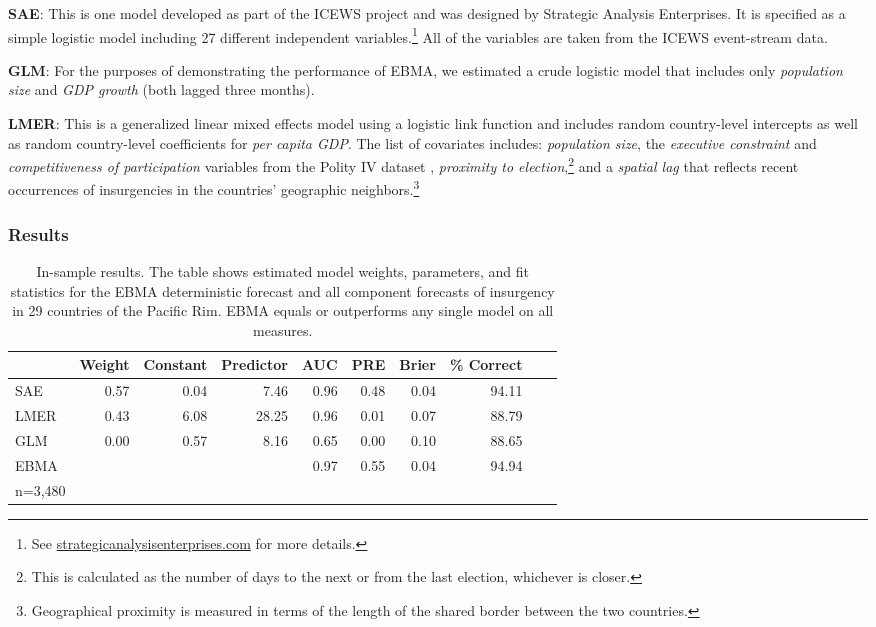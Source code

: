 \documentclass[pdftex,12pt,fullpage,oneside]{amsart}
\begin{document}
\begin{list}{}{\leftmargin=1em}
\item \textbf{SAE}: This is one model developed as part of the ICEWS
  project and was designed by Strategic Analysis Enterprises. It is
  specified as a simple logistic model including 27 different
  independent variables.\footnote{See
    \url{strategicanalysisenterprises.com} for more details.}  All of the variables are taken from the ICEWS
  event-stream data.
\item \textbf{GLM}: For the purposes of demonstrating the performance
  of EBMA, we estimated a crude logistic model that
  includes only \textit{population size} and \textit{GDP growth} (both
  lagged three months).
\item \textbf{LMER}: This is a generalized linear mixed effects model
  using a logistic link function and includes random country-level
  intercepts as well as random country-level coefficients for
  \textit{per capita GDP}.  The list of covariates includes:
  \textit{population size}, the \textit{executive constraint} and
  \textit{competitiveness of participation} variables from the Polity
  IV dataset \citep{PolityIV}, \textit{proximity to
    election},\footnote{This is calculated as the number of days to
    the next or from the last election, whichever is closer.} and a
  \textit{spatial lag} that reflects recent occurrences of
  insurgencies in the countries' geographic
  neighbors.\footnote{Geographical proximity is measured in terms of
    the length of the shared border between the two countries.}
\end{list}

\subsubsection{Results}



\begin{table}[h!]
\small
\begin{center}
  \caption{\footnotesize In-sample results. The table shows estimated
    model weights, parameters, and fit statistics for the EBMA
    deterministic forecast and all component forecasts of insurgency
    in 29 countries of the Pacific Rim. EBMA equals or outperforms any
    single model on all measures.}\label{InSam1}
\begin{tabular}{l rrrrrrrrr}
  \toprule
 & Weight & Constant & Predictor & AUC & PRE & Brier & \% Correct \\ 
  \midrule
  SAE & 0.57 & 0.04 & 7.46 & 0.96 & 0.48 & 0.04 & 94.11\\ 
  LMER & 0.43 & 6.08 & 28.25 & 0.96 & 0.01 & 0.07 & 88.79\\ 
  GLM & 0.00 & 0.57 & 8.16 & 0.65 & 0.00 & 0.10 & 88.65\\ 
  EBMA &  &  &  & 0.97 & 0.55 & 0.04 & 94.94\\ 
   \bottomrule
n=3,480\\
\end{tabular}
\end{center}
\end{table}
\end{document}
